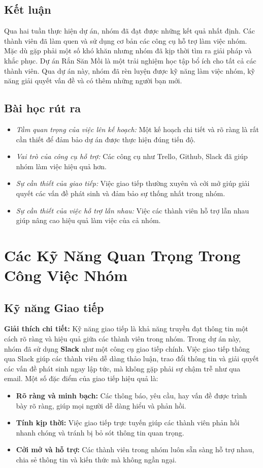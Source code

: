 \documentclass[a4paper,12pt]{article}
\begin{document}
\subsection{Kết luận}
Qua hai tuần thực hiện dự án, nhóm đã đạt được những kết quả nhất định. Các thành viên đã làm quen và sử dụng cơ bản các công cụ hỗ trợ làm việc nhóm. Mặc dù gặp phải một số khó khăn nhưng nhóm đã kịp thời tìm ra giải pháp và khắc phục. Dự án Rắn Săn Mồi là một trải nghiệm học tập bổ ích cho tất cả các thành viên. Qua dự án này, nhóm đã rèn luyện được kỹ năng làm việc nhóm, kỹ năng giải quyết vấn đề và có thêm những người bạn mới.

\subsection{Bài học rút ra}
\begin{itemize}
    \item \textit{Tầm quan trọng của việc lên kế hoạch:} Một kế hoạch chi tiết và rõ ràng là rất cần thiết để đảm bảo dự án được thực hiện đúng tiến độ.
    \item \textit{Vai trò của công cụ hỗ trợ:} Các công cụ như Trello, Github, Slack đã giúp nhóm làm việc hiệu quả hơn.
    \item \textit{Sự cần thiết của giao tiếp:} Việc giao tiếp thường xuyên và cởi mở giúp giải quyết các vấn đề phát sinh và đảm bảo sự thống nhất trong nhóm.
    \item \textit{Sự cần thiết của việc hỗ trợ lẫn nhau:} Việc các thành viên hỗ trợ lẫn nhau giúp nâng cao hiệu quả làm việc của cả nhóm.
\end{itemize}

\newpage
\section{Các Kỹ Năng Quan Trọng Trong Công Việc Nhóm}

\subsection{Kỹ năng Giao tiếp}
\textbf{Giải thích chi tiết:}  
Kỹ năng giao tiếp là khả năng truyền đạt thông tin một cách rõ ràng và hiệu quả giữa các thành viên trong nhóm. Trong dự án này, nhóm đã sử dụng \textbf{Slack} như một công cụ giao tiếp chính. Việc giao tiếp thông qua Slack giúp các thành viên dễ dàng thảo luận, trao đổi thông tin và giải quyết các vấn đề phát sinh ngay lập tức, mà không gặp phải sự chậm trễ như qua email. Một số đặc điểm của giao tiếp hiệu quả là:
\begin{itemize}
    \item \textbf{Rõ ràng và minh bạch:} Các thông báo, yêu cầu, hay vấn đề được trình bày rõ ràng, giúp mọi người dễ dàng hiểu và phản hồi.
    \item \textbf{Tính kịp thời:} Việc giao tiếp trực tuyến giúp các thành viên phản hồi nhanh chóng và tránh bị bỏ sót thông tin quan trọng.
    \item \textbf{Cởi mở và hỗ trợ:} Các thành viên trong nhóm luôn sẵn sàng hỗ trợ nhau, chia sẻ thông tin và kiến thức mà không ngần ngại.
\end{itemize}
\end{document}
